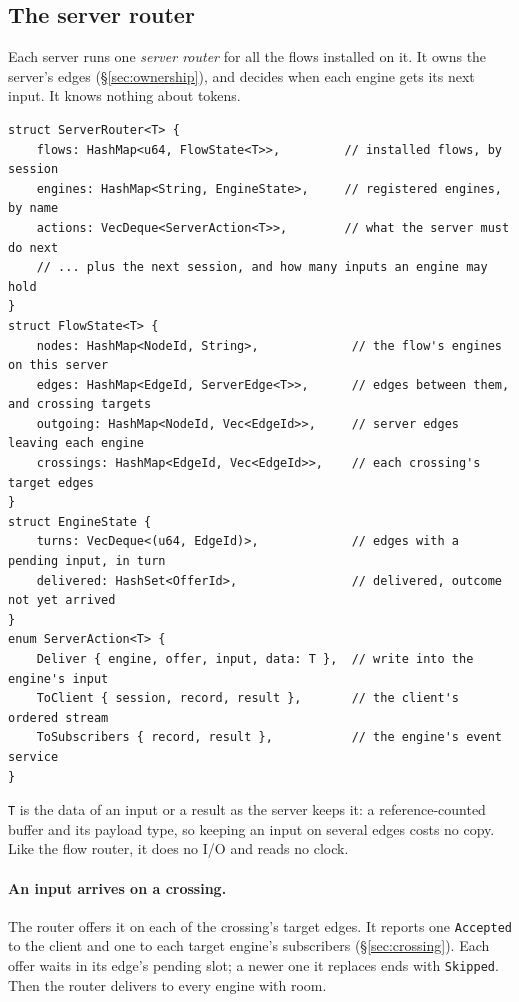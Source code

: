 \documentclass[11pt]{article}
\newcommand{\code}[1]{\texttt{#1}}
\begin{document}
\subsection{The server router}
\label{sec:server-router}

Each server runs one \emph{server router} for all the flows installed on it.
It owns the server's edges (\S\ref{sec:ownership}), and decides when each
engine gets its next input. It knows nothing about tokens.
\begin{lstlisting}
struct ServerRouter<T> {
    flows: HashMap<u64, FlowState<T>>,         // installed flows, by session
    engines: HashMap<String, EngineState>,     // registered engines, by name
    actions: VecDeque<ServerAction<T>>,        // what the server must do next
    // ... plus the next session, and how many inputs an engine may hold
}
struct FlowState<T> {
    nodes: HashMap<NodeId, String>,             // the flow's engines on this server
    edges: HashMap<EdgeId, ServerEdge<T>>,      // edges between them, and crossing targets
    outgoing: HashMap<NodeId, Vec<EdgeId>>,     // server edges leaving each engine
    crossings: HashMap<EdgeId, Vec<EdgeId>>,    // each crossing's target edges
}
struct EngineState {
    turns: VecDeque<(u64, EdgeId)>,             // edges with a pending input, in turn
    delivered: HashSet<OfferId>,                // delivered, outcome not yet arrived
}
enum ServerAction<T> {
    Deliver { engine, offer, input, data: T },  // write into the engine's input
    ToClient { session, record, result },       // the client's ordered stream
    ToSubscribers { record, result },           // the engine's event service
}
\end{lstlisting}
\code{T} is the data of an input or a result as the server keeps it: a
reference-counted buffer and its payload type, so keeping an input on several
edges costs no copy. Like the flow router, it does no I/O and reads no
clock.

\paragraph{An input arrives on a crossing.} The router offers it on each of
the crossing's target edges. It reports one \code{Accepted} to the client and
one to each target engine's subscribers (\S\ref{sec:crossing}). Each offer
waits in its edge's pending slot; a newer one it replaces ends with
\code{Skipped}. Then the router delivers to every engine with room.
\end{document}
